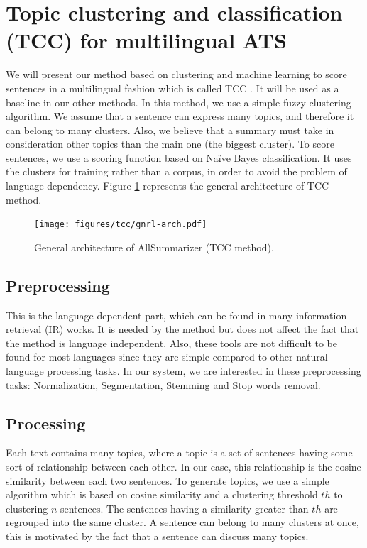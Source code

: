 \documentclass[12pt, oneside, a4paper]{article}
\begin{document}
\section{Topic clustering and classification (TCC) for multilingual ATS}

We will present our method based on clustering and machine learning to score sentences in a multilingual fashion which is called TCC \citep{13-aries-al,15-aries-al}. 
It will be used as a baseline in our other methods. 
%
In this method, we use a simple fuzzy clustering algorithm.
We assume that a sentence can express many topics, and therefore it can belong to many clusters.
Also, we believe that a summary must take in consideration other topics than the main one (the biggest cluster).
To score sentences, we use a scoring function based on Na\"ive Bayes classification. 
It uses the clusters for training rather than a corpus, in order to avoid the problem of language dependency.
Figure \ref{fig:gnrl-arch} represents the general architecture of TCC method.

\begin{figure}[ht]
	\begin{center}
		\texttt{[image: figures/tcc/gnrl-arch.pdf]}
	\end{center}
	\caption{\label{fig:gnrl-arch} General architecture of AllSummarizer (TCC method).}
\end{figure}

\subsection{Preprocessing}

This is the language-dependent part, which can be found in many information retrieval (IR) works. 
It is needed by the method but does not affect the fact that the method is language independent. 
Also, these tools are not difficult to be found for most languages since they are simple compared to other natural language processing tasks.
In our system, we are interested in these preprocessing tasks: Normalization, Segmentation, Stemming and Stop words removal.

\subsection{Processing}

Each text contains many topics, where a topic is a set of sentences having some sort of relationship between each other.
In our case, this relationship is the cosine similarity between each two sentences. 
To generate topics, we use a simple algorithm which is based on cosine similarity and a clustering threshold $ th $ to clustering $ n $ sentences.
The sentences having a similarity greater than $ th $ are regrouped into the same cluster. 
A sentence can belong to many clusters at once, this is motivated by the fact that a sentence can discuss many topics.
\end{document}
